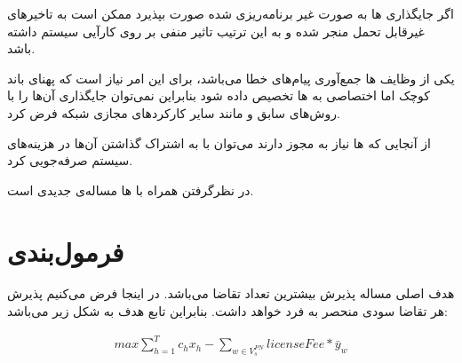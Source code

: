 اگر جایگذاری ها به صورت غیر برنامه‌ریزی شده صورت بپذیرد
ممکن است به تاخیرهای غیرقابل تحمل منجر شده و به این ترتیب تاثیر منفی بر روی کارآیی سیستم
داشته باشد.

یکی از وظایف ها جمع‌آوری پیام‌های خطا می‌باشد،
برای این امر نیاز است که پهنای باند کوچک اما اختصاصی به ها
تخصیص داده شود بنابراین نمی‌توان جایگذاری آن‌ها را با روش‌های سابق و مانند سایر
کارکردهای مجازی شبکه فرض کرد.

از آنجایی که ها نیاز به مجوز دارند می‌توان با به اشتراک گذاشتن آن‌ها در هزینه‌های سیستم صرفه‌جویی کرد.

در نظرگرفتن  همراه با ها مساله‌ی جدیدی است.

\section{فرمول‌بندی}

هدف اصلی مساله پذیرش بیشترین تعداد تقاضا می‌باشد. در اینجا فرض می‌کنیم پذیرش هر تقاضا سودی منحصر به فرد خواهد داشت.
بنابراین تابع هدف به شکل زیر می‌باشد:

\begin{latin}\begin{align}
    max \sum_{h=1}^{T} c_hx_h - \sum_{w \in V_s^{PN}} licenseFee * \bar{y}_w
\end{align}\end{latin}

